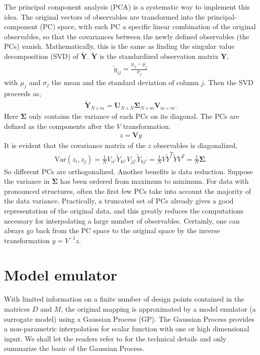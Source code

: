 The principal component analysis (PCA) is a systematic way to implement this idea.
The original vectors of observables are transformed into the principal-component (PC) space, with each PC a specific linear combination of the original observables, so that the covariances between the newly defined observables (the PCs) vanish.
Mathematically, this is the same as finding the singular value decomposition (SVD) of $\mathbf{\tilde{Y}}$. 
$\mathbf{\tilde{Y}}$ is the standardized observation matrix $\mathbf{Y}$,
\begin{eqnarray}
\tilde{y}_{ij} = \frac{y_{ij} - \mu_j}{\sigma_j}
\end{eqnarray}
with $\mu_j$ and $\sigma_j$ the mean and the standard deviation of column $j$.
Then the SVD proceeds as,
\begin{eqnarray}
\tilde{\mathbf{Y}}_{N\times m} = \mathbf{U}_{N\times N} \mathbf{\Sigma}_{N\times m} \mathbf{V}_{m\times m}.
\end{eqnarray}
Here $\mathbf{\Sigma}$ only contains the variance of each PCs on its diagonal.
The PCs are defined as the components after the $V$ transformation.
\begin{eqnarray}
z = \mathbf{V}y
\end{eqnarray}
It is evident that the covariance matrix of the $z$ observables is diagonalized,
\begin{eqnarray}
\mathrm{Var}(z_i, z_j) = \frac{1}{N}V_{ii'}\tilde{Y}_{ki'}V_{jj'}\tilde{Y}_{kj'} = \frac{1}{N}V\tilde{Y}^T\tilde{Y}V^T = \frac{1}{N}\mathbf{\Sigma}.
\end{eqnarray}
So different PCs are orthogonalized.
Another benefits is data reduction. 
Suppose the variance in $\mathbf{\Sigma}$ has been ordered from maximum to minimum.
For data with pronounced structures, often the first few PCs take into account the majority of the data variance.
Practically, a truncated set of PCs already gives a good representation of the original data, and this greatly reduces the computations necessary for interpolating a large number of observables.
Certainly, one can always go back from the PC space to the original space by the inverse transformation $y = V^{-1} z$.

\section{Model emulator}
With limited information on a finite number of design points contained in the matrices $D$ and $M$, the original mapping is approximated by a model emulator (a surrogate model) using a Gaussian Process (GP).
The Gaussian Process provides a non-parametric interpolation for scalar function with one or high dimensional input.
We shall let the readers refer to \cite{rasmussen2006gaussian} for the technical details and only summarize the basic of the Gaussian Process.

